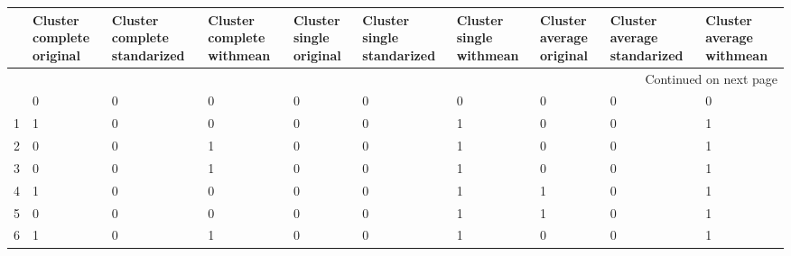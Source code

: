 \begin{longtable}{cp{1.5cm}p{1.5cm}p{1.5cm}p{1.5cm}p{1.5cm}p{1.5cm}p{1.5cm}p{1.5cm}p{1.5cm}}
\toprule
{} &  Cluster complete original &  Cluster complete standarized &  Cluster complete withmean &  Cluster single original &  Cluster single standarized &  Cluster single withmean &  Cluster average original &  Cluster average standarized &  Cluster average withmean \\
\midrule
\endhead
\midrule
\multicolumn{10}{r}{{Continued on next page}} \\
\midrule
\endfoot

\bottomrule
\endlastfoot
0  &                          0 &                             0 &                          0 &                        0 &                           0 &                        0 &                         0 &                            0 &                         0 \\
1  &                          1 &                             0 &                          0 &                        0 &                           0 &                        1 &                         0 &                            0 &                         1 \\
2  &                          0 &                             0 &                          1 &                        0 &                           0 &                        1 &                         0 &                            0 &                         1 \\
3  &                          0 &                             0 &                          1 &                        0 &                           0 &                        1 &                         0 &                            0 &                         1 \\
4  &                          1 &                             0 &                          0 &                        0 &                           0 &                        1 &                         1 &                            0 &                         1 \\
5  &                          0 &                             0 &                          0 &                        0 &                           0 &                        1 &                         1 &                            0 &                         1 \\
6  &                          1 &                             0 &                          1 &                        0 &                           0 &                        1 &                         0 &                            0 &                         1 \\

\end{longtable}
